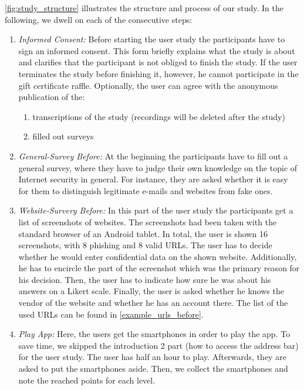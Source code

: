 \autoref{fig:study_structure} illustrates the structure and process of our study. In the following, we dwell on each of the consecutive steps:
\begin{enumerate}
	\item \textit{Informed Consent:} Before starting the user study the participants have to sign an informed consent.
This form briefly explains what the study is about and clarifies that the participant is not obliged to finish the study.
If the user terminates the study before finishing it, however, he cannot participate in the gift certificate raffle.
Optionally, the user can agree with the anonymous publication of the:
	\begin{enumerate}
		\item transcriptions of the study (recordings will be deleted after the study)
		\item filled out surveys
	\end{enumerate}

	\item \textit{General-Survey Before:} At the beginning the participants have to fill out a general survey, where they have to judge their own knowledge on the topic of Internet security in general.
 For instance, they are asked whether it is easy for them to distinguish legitimate e-mails and websites from fake ones.

	\item \textit{Website-Survery Before:} In this part of the user study the participants get a list of screenshots of websites.
 The screenshots had been taken with the standard browser of an Android tablet.
 In total, the user is shown 16 screenshots, with 8 phishing and 8 valid URLs.
 The user has to decide whether he would enter confidential data on the shown website.
 Additionally, he has to encircle the part of the screenshot which was the primary reason for his decision.
 Then, the user has to indicate how sure he was about his answers on a Likert scale.
 Finally, the user is asked whether he knows the vendor of the website and whether he has an account there.
 The list of the used URLs can be found in \autoref{example_urls_before}.

	\item \textit{Play App:} Here, the users get the smartphones in order to play the app.
 To save time, we skipped the introduction 2 part (how to access the address bar) for the user study.
 The user has half an hour to play.
 Afterwards, they are asked to put the smartphones aside.
 Then, we collect the smartphones and note the reached points for each level.


\end{enumerate}
